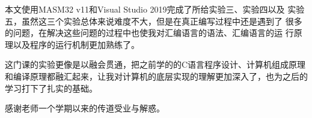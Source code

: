 %
%
%
%
%
%

\renewcommand{\thechapter}{总结}


本文使用MASM32 v11和Visual Studio 2019完成了所给实验三、实验四以及
实验五，虽然这三个实验总体来说难度不大，但是在真正编写过程中还是遇到了
很多的问题，在解决这些问题的过程中也使我对汇编语言的语法、汇编语言的运
行原理以及程序的运行机制更加熟练了。

这门课的实验更像是以融会贯通，把之前学的的C语言程序设计、计算机组成原理
和编译原理都融汇起来，让我对计算机的底层实现的理解更加深入了，也为之后的
学习打下了扎实的基础。

感谢老师一个学期以来的传道受业与解惑。
